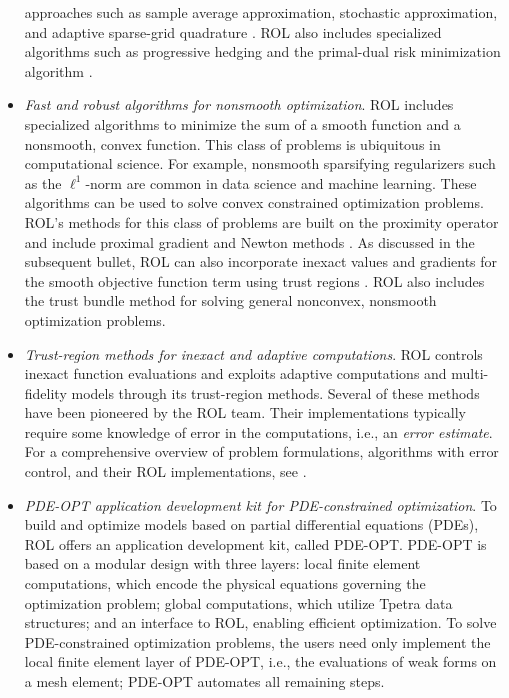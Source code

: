 \begin{itemize}
approaches such as sample average approximation, stochastic approximation, and
adaptive sparse-grid quadrature \cite{kouri2013trust,kouri2014inexact}. ROL
also includes specialized algorithms such as progressive hedging
\cite{rockafellar1991scenarios} and the primal-dual risk minimization algorithm
\cite{kouri2022primal}.
\item
\emph{Fast and robust algorithms for nonsmooth optimization}.
ROL includes specialized algorithms to minimize the sum of a smooth function
and a nonsmooth, convex function.  This class of problems is ubiquitous in
computational science.  For example, nonsmooth sparsifying regularizers such as
the $\ell^1$-norm are common in data science and machine learning.  These
algorithms can be used to solve convex constrained optimization problems.
ROL's methods for this class of problems are built on the proximity operator
and include proximal gradient and Newton methods
\cite{beck2017first,kanzow2021globalized,ochs2014iPiano}.
As discussed in the subsequent bullet, ROL can also incorporate inexact
values and gradients for the smooth objective function term using trust regions
\cite{baraldi2023proximal}.
ROL also includes the trust bundle method \cite{schramm1992bundle}
for solving general nonconvex, nonsmooth optimization problems.
\item
\emph{Trust-region methods for inexact and adaptive computations}.
ROL controls inexact function evaluations and exploits adaptive computations
and multi-fidelity models through its trust-region methods. Several of these methods
have been pioneered by the ROL team.  Their implementations typically require some
knowledge of error in the computations, i.e., an \emph{error estimate}.
For a comprehensive overview of problem formulations, algorithms with error control,
and their ROL implementations, see \cite{Kouri2018}.
\item
\emph{PDE-OPT application development kit for PDE-constrained optimization}.
To build and optimize models based on partial differential equations (PDEs),
ROL offers an application development kit, called PDE-OPT. PDE-OPT is based on a
modular design with three layers: local finite element computations,
which encode the physical equations governing the optimization problem;
global computations, which utilize Tpetra data structures;
and an interface to ROL, enabling efficient optimization.
To solve PDE-constrained optimization problems, the users need only implement the
local finite element layer of PDE-OPT, i.e., the evaluations of weak forms on
a mesh element; PDE-OPT automates all remaining steps.
\end{itemize}



